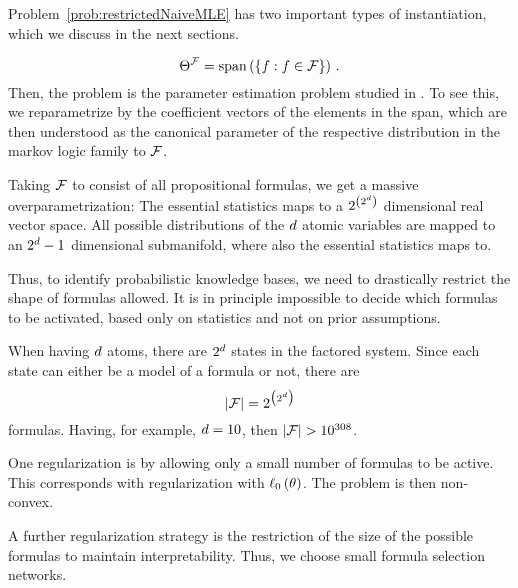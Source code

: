 Problem~\ref{prob:restrictedNaiveMLE} has two important types of instantiation, which we discuss in the next sections.


\[ \Theta^{\mathcal{F}} = \mathrm{span}\left(\{f : f\in\mathcal{F} \}\right) \, . \]
Then, the problem is the parameter estimation problem studied in .
To see this, we reparametrize by the coefficient vectors of the elements in the span, which are then understood as the canonical parameter of the respective distribution in the markov logic family to $\mathcal{F}$.


\begin{remark}[Overparametrization]
    Taking $\mathcal{F}$ to consist of all propositional formulas, we get a massive overparametrization:
    The essential statistics maps to a $2^{\left(2^d \right)}$ dimensional real vector space.
    All possible distributions of the $d$ atomic variables are mapped to an $2^d-1$ dimensional submanifold, where also the essential statistics maps to.

    Thus, to identify probabilistic knowledge bases, we need to drastically restrict the shape of formulas allowed.
    It is in principle impossible to decide which formulas to be activated, based only on statistics and not on prior assumptions.

    When having $d$ atoms, there are $2^{d}$ states in the factored system.
    Since each state can either be a model of a formula or not, there are
    \[ \left|\mathcal{F}\right| = 2^{\big(2^d \big)} \]
    formulas.
    Having, for example, $d=10$, then $\cardof{\formulaset}>10^{308}$.


    One regularization is by allowing only a small number of formulas to be active.
    This corresponds with regularization with $\ell_0\left(\theta\right)$.
    The problem is then non-convex.


    A further regularization strategy is the restriction of the size of the possible formulas to maintain interpretability.
    Thus, we choose small formula selection networks.
\end{remark}




